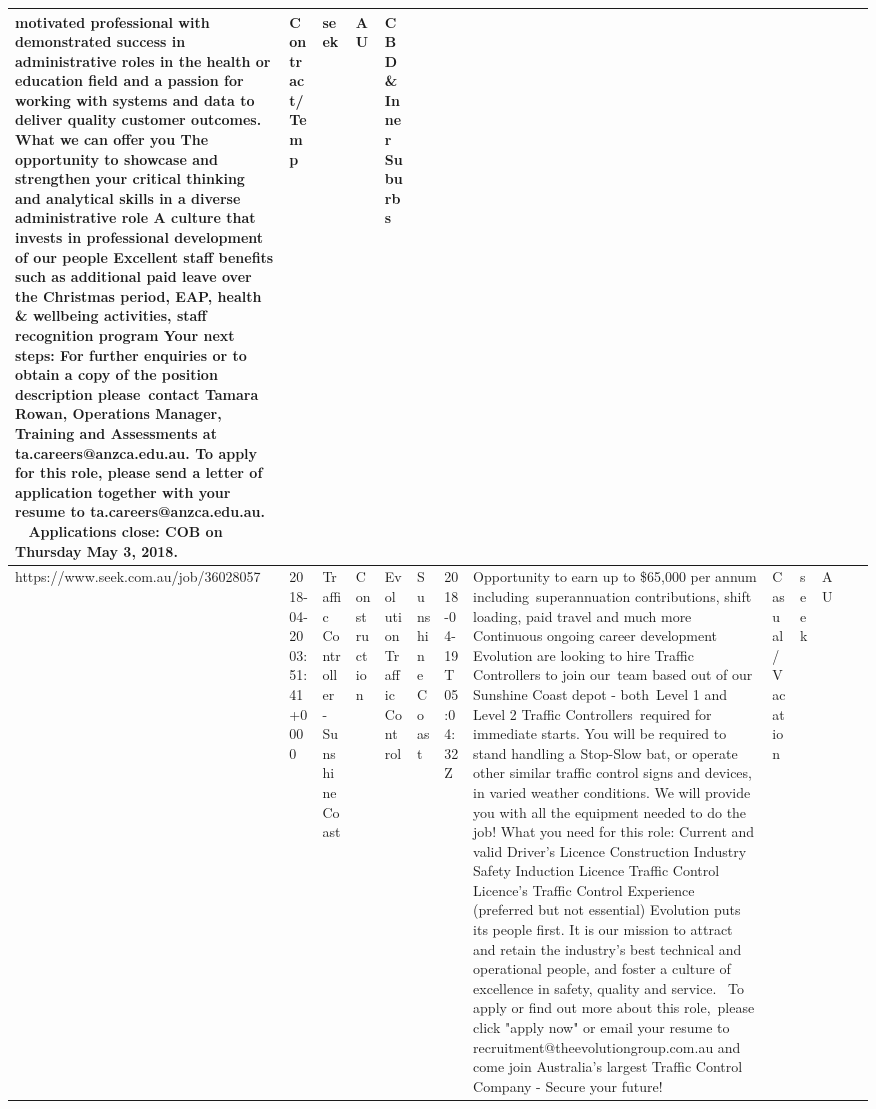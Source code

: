\documentclass[11pt,a4paper,]{article}
\begin{document}
\begin{table}
\begin{tabular}[t]{l|l|l|l|l|l|l|l|l|l|l|l|l}
motivated professional with demonstrated success in administrative roles in the health or education field and a passion for working with systems and data to deliver quality customer outcomes. What we can offer you The opportunity to showcase and strengthen your critical thinking and analytical skills in a diverse administrative role A culture that invests in professional development of our people Excellent staff benefits such as additional paid leave over the Christmas period, EAP, health \& wellbeing activities, staff recognition program Your next steps: For further enquiries or to obtain a copy of the position description please contact Tamara Rowan, Operations Manager, Training and Assessments at ta.careers@anzca.edu.au. To apply for this role, please send a letter of application together with your resume to ta.careers@anzca.edu.au.   Applications close: COB on Thursday May 3, 2018. & Contract/Temp & seek & AU & CBD \& Inner Suburbs & \\
\hline
https://www.seek.com.au/job/36028057 & 2018-04-20 03:51:41 +0000 & Traffic Controller - Sunshine Coast & Construction & Evolution Traffic Control & Sunshine Coast & 2018-04-19T05:04:32Z & Opportunity to earn up to \$65,000 per annum including superannuation contributions, shift loading, paid travel and much more Continuous ongoing career development Evolution are looking to hire Traffic Controllers to join our team based out of our Sunshine Coast depot - both Level 1 and Level 2 Traffic Controllers required for immediate starts. You will be required to stand handling a Stop-Slow bat, or operate other similar traffic control signs and devices, in varied weather conditions. We will provide you with all the equipment needed to do the job! What you need for this role: Current and valid Driver's Licence Construction Industry Safety Induction Licence Traffic Control Licence's Traffic Control Experience (preferred but not essential) Evolution puts its people first. It is our mission to attract and retain the industry's best technical and operational people, and foster a culture of excellence in safety, quality and service.  To apply or find out more about this role, please click "apply now" or email your resume to recruitment@theevolutiongroup.com.au and come join Australia's largest Traffic Control Company - Secure your future! & Casual/Vacation & seek & AU &  & \\
\hline

\end{tabular}
\end{table}
\end{document}
